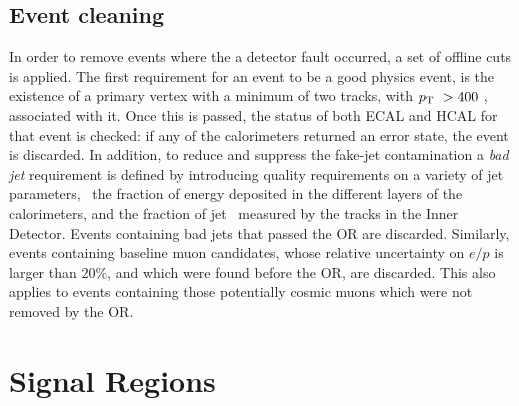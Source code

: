 		\subsection*{Event cleaning}

			In order to remove events where the a detector fault occurred, a set of offline cuts is applied. The first requirement for an event to be a good physics event, is the existence of a primary vertex with a minimum of two tracks, with $p_{\mathrm{T}}\ > 400$ \MeV, associated with it. Once this is passed, the status of both \ac{ECAL} and \ac{HCAL} for that event is checked: if any of the calorimeters returned an error state, the event is discarded. In addition, to reduce and suppress the fake-jet contamination a \emph{bad jet} requirement is defined by introducing quality requirements on a variety of jet parameters, \eg\ the fraction of energy deposited in the different layers of the calorimeters, and the fraction of jet \pt\ measured by the tracks in the Inner Detector. Events containing bad jets that passed the \ac{OR} are discarded. Similarly, events containing baseline muon candidates, whose relative uncertainty on $e/p$ is larger than $20\%$, and which were found before the \ac{OR}, are discarded. This also applies to events containing those potentially cosmic muons which were not removed by the \ac{OR}.	


	\section{Signal Regions}
	\label{sec:SRs}

		










